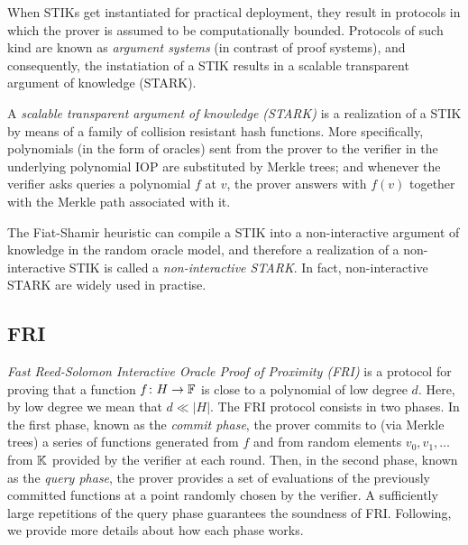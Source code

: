 When STIKs get instantiated for practical deployment, they result in protocols in which the prover is assumed to be computationally bounded. Protocols of such kind are known as \textit{argument systems} (in contrast of proof systems), and consequently, the instatiation of a STIK results in a scalable transparent argument of knowledge (STARK).
\begin{definition}[STARK]\label{def:STARK}
  A \textit{scalable transparent argument of knowledge (STARK)} is a realization of a STIK by means of a family of collision resistant hash functions. More specifically, polynomials (in the form of oracles) sent from the prover to the verifier in the underlying polynomial IOP are substituted by Merkle trees; and whenever the verifier asks queries a polynomial $f$ at $v$, the prover answers with $f(v)$ together with the Merkle path associated with it. 
\end{definition}

The Fiat-Shamir heuristic \cite{C:FiaSha86} can compile a STIK into a non-interactive argument of knowledge in the random oracle model, and therefore a realization of a non-interactive STIK is called a \textit{non-interactive STARK}. In fact, non-interactive STARK are widely used in practise. %




\subsection{FRI}\label{sec:FRI}

\textit{Fast Reed-Solomon Interactive Oracle Proof of Proximity (FRI)} \cite{EPRINT:BCIKS20} is a protocol for proving that a function $f \colon H \to \mathbb{F}$ is close to a polynomial of low degree $d$. Here, by low degree we mean that $d \ll |H|$.
The FRI protocol consists in two phases. In the first phase, known as the \textit{commit phase}, the prover commits to (via Merkle trees) a series of functions generated from $f$ and from random elements $v_0,v_1,\dots$ from $\mathbb{K}$ provided by the verifier at each round.
Then, in the second phase, known as the \textit{query phase}, the prover provides a set of evaluations of the previously committed functions at a point randomly chosen by the verifier. 
A sufficiently large repetitions of the query phase guarantees the soundness of FRI.
Following, we provide more details about how each phase works.


